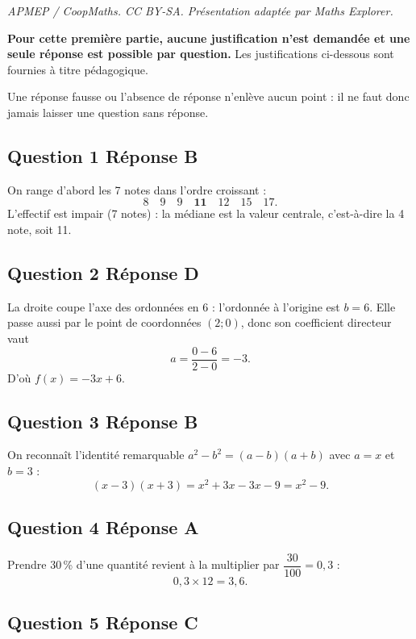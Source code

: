 \documentclass[10pt]{article}
\begin{document}
\noindent\textit{APMEP / CoopMaths. CC BY-SA. Présentation adaptée par Maths Explorer.}\par\medskip
\textbf{Pour cette première partie, aucune justification n'est demandée et une seule réponse est possible par question.} Les justifications ci-dessous sont fournies à titre pédagogique.

Une réponse fausse ou l'absence de réponse n'enlève aucun point : il ne faut donc jamais laisser une question sans réponse.

\subsection*{Question 1 \quad Réponse B}

On range d'abord les 7 notes dans l'ordre croissant :
\[8 \quad 9 \quad 9 \quad \mathbf{11} \quad 12 \quad 15 \quad 17.\]
L'effectif est impair (7 notes) : la médiane est la valeur centrale, c'est-à-dire la
4 note, soit 11.

\subsection*{Question 2 \quad Réponse D}

La droite coupe l'axe des ordonnées en 6 : l'ordonnée à l'origine est $b = 6$. Elle passe
aussi par le point de coordonnées $(2 ; 0)$, donc son coefficient directeur vaut
\[a = \dfrac{0 - 6}{2 - 0} = -3.\]
D'où $f(x) = -3x + 6$.

\subsection*{Question 3 \quad Réponse B}

On reconnaît l'identité remarquable $a^2 - b^2 = (a-b)(a+b)$ avec $a = x$ et $b = 3$ :
\[(x-3)(x+3) = x^2 + 3x - 3x - 9 = x^2 - 9.\]

\subsection*{Question 4 \quad Réponse A}

Prendre 30\,\% d'une quantité revient à la multiplier par $\dfrac{30}{100} = 0,3$ :
\[0,3 \times 12 = 3,6.\]

\subsection*{Question 5 \quad Réponse C}
\end{document}
